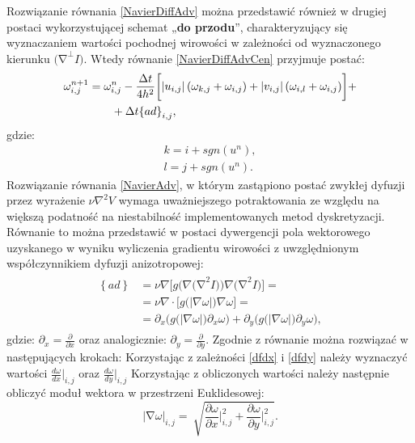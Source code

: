 \documentclass[12pt, twoside, openany]{report}
\theoremstyle{definition}
\begin{document}
Rozwiązanie równania \eqref{NavierDiffAdv} można przedstawić również w drugiej postaci wykorzystującej schemat „\textbf{do przodu}”, charakteryzujący się wyznaczaniem wartości pochodnej wirowości w zależności od wyznaczonego kierunku ${\mathrm{(}\mathrm{\nabla }}^{\bot }I)$.  Wtedy równanie \eqref{NavierDiffAdvCen} przyjmuje postać:
\begin{align}
\fontsize{11} \omega
\omega^{n+1}_{i,j} &= {\omega }^n_{i,j} - \frac{\Delta t}{4h^2}\biggl[\left|u_{i,j}\right|
\left({\omega }_{k,j}+{\omega }_{i,j}\right)+
\left|v_{i,j}\right| \left({\omega }_{i,l}+{\omega }_{i,j}\right) \biggr] + \notag\\ 
&\qquad+ \Delta t {\left\{ad\right\}}_{i,j},
\label{NavierDiffAdvFor}
\end{align}
gdzie:
\begin{align}
k = i+sgn\left(u^n\right), \\
l = j+sgn(u^n).
\end{align}
Rozwiązanie równania \eqref{NavierAdv}, w którym zastąpiono postać zwykłej dyfuzji przez wyrażenie $\nu {\nabla }^2V$ wymaga uważniejszego potraktowania ze względu na większą podatność na niestabilność implementowanych metod dyskretyzacji. Równanie to można przedstawić w postaci dywergencji pola wektorowego uzyskanego w wyniku wyliczenia gradientu wirowości z uwzględnionym współczynnikiem dyfuzji anizotropowej:
\begin{align}
\begin{aligned}
\left\{ad\right\} 
&= \nu \nabla\Big[g\Big(\nabla {(\mathrm{\nabla }}^2I)\Big)\nabla {\mathrm{(}\mathrm{\nabla }}^2I)\Big]= \\[1ex]
&= \nu \nabla \cdot \Big[g\big(|\nabla \omega|\big)\nabla \omega \Big]=\\[1ex]
&= \partial _x \Big(g\big(\left|\nabla \omega \right|\big){\partial }_x\omega \Big)+ \partial_y \Big(g\big(\left|\nabla \omega \right|\big){\partial }_y\omega \Big),
\end{aligned}
\label{Anisotropic}
\end{align}
gdzie: ${\partial }_x=\frac{\partial }{\partial x}$ oraz analogicznie: ${\partial }_y=\frac{\partial }{\partial y}$.
Zgodnie z \cite{ebrahimi2012navier} równanie można rozwiązać w następujących krokach:
Korzystając z zależności \eqref{dfdx} i \eqref{dfdy} należy wyznaczyć wartości ${\frac{d\omega }{dx}}\big|_{i,j}$ oraz ${\frac{d\omega }{dy}}\big|_{i,j}$
Korzystając z obliczonych wartości należy następnie obliczyć moduł wektora w przestrzeni Euklidesowej:
\begin{equation}
{\left|\mathrm{\nabla }\omega \right|}_{i,j}=\ \sqrt{\frac{\partial \omega }{\partial x}\bigg|^2_{i,j}+\frac{\partial \omega }{\partial y}\bigg|^2_{i,j}}
\label{magnitudedw}
.
\end{equation}
\end{document}
